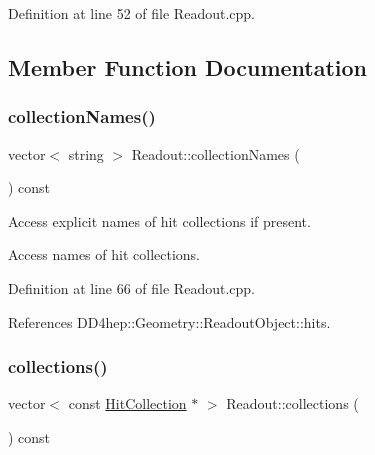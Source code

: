 Definition at line 52 of file Readout.\+cpp.



\subsection{Member Function Documentation}
\hypertarget{class_d_d4hep_1_1_geometry_1_1_readout_a960ca3710a0c63d5b22bbcebbb46752e}{}\label{class_d_d4hep_1_1_geometry_1_1_readout_a960ca3710a0c63d5b22bbcebbb46752e} 
\subsubsection{\texorpdfstring{collection\+Names()}{collectionNames()}}
{\footnotesize\ttfamily vector$<$ string $>$ Readout\+::collection\+Names (\begin{DoxyParamCaption}{ }\end{DoxyParamCaption}) const}



Access explicit names of hit collections if present. 

Access names of hit collections. 

Definition at line 66 of file Readout.\+cpp.



References D\+D4hep\+::\+Geometry\+::\+Readout\+Object\+::hits.

\hypertarget{class_d_d4hep_1_1_geometry_1_1_readout_a8ec398442eb05aa1c10349e380904f49}{}\label{class_d_d4hep_1_1_geometry_1_1_readout_a8ec398442eb05aa1c10349e380904f49} 
\subsubsection{\texorpdfstring{collections()}{collections()}}
{\footnotesize\ttfamily vector$<$ const \hyperlink{class_d_d4hep_1_1_geometry_1_1_hit_collection}{Hit\+Collection} $\ast$ $>$ Readout\+::collections (\begin{DoxyParamCaption}{ }\end{DoxyParamCaption}) const}



